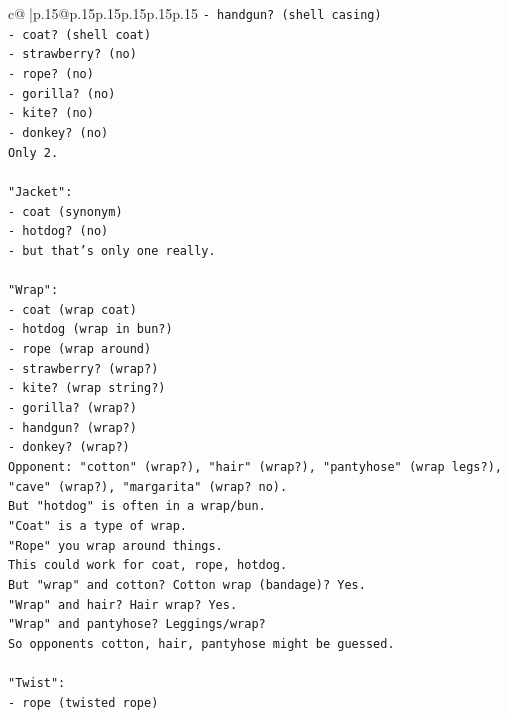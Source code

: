 \documentclass{article}
\begin{document}
{\begin{supertabular}{c@{$\;$}|p{.15\linewidth}@{}p{.15\linewidth}p{.15\linewidth}p{.15\linewidth}p{.15\linewidth}p{.15\linewidth}}
{{{\texttt{{-} handgun? (shell casing)} \\
\texttt{{-} coat? (shell coat)} \\
\texttt{{-} strawberry? (no)} \\
\texttt{{-} rope? (no)} \\
\texttt{{-} gorilla? (no)} \\
\texttt{{-} kite? (no)} \\
\texttt{{-} donkey? (no)} \\
\texttt{Only 2.} \\
\\ 
\texttt{"Jacket":} \\
\texttt{{-} coat (synonym)} \\
\texttt{{-} hotdog? (no)} \\
\texttt{{-} but that's only one really.} \\
\\ 
\texttt{"Wrap":} \\
\texttt{{-} coat (wrap coat)} \\
\texttt{{-} hotdog (wrap in bun?)} \\
\texttt{{-} rope (wrap around)} \\
\texttt{{-} strawberry? (wrap?)} \\
\texttt{{-} kite? (wrap string?)} \\
\texttt{{-} gorilla? (wrap?)} \\
\texttt{{-} handgun? (wrap?)} \\
\texttt{{-} donkey? (wrap?)} \\
\texttt{Opponent: "cotton" (wrap?), "hair" (wrap?), "pantyhose" (wrap legs?), "cave" (wrap?), "margarita" (wrap? no).} \\
\texttt{But "hotdog" is often in a wrap/bun.} \\
\texttt{"Coat" is a type of wrap.} \\
\texttt{"Rope" you wrap around things.} \\
\texttt{This could work for coat, rope, hotdog.} \\
\texttt{But "wrap" and cotton? Cotton wrap (bandage)? Yes.} \\
\texttt{"Wrap" and hair? Hair wrap? Yes.} \\
\texttt{"Wrap" and pantyhose? Leggings/wrap?} \\
\texttt{So opponents cotton, hair, pantyhose might be guessed.} \\
\\ 
\texttt{"Twist":} \\
\texttt{{-} rope (twisted rope)} \\
}}}
\end{supertabular}}
\end{document}
